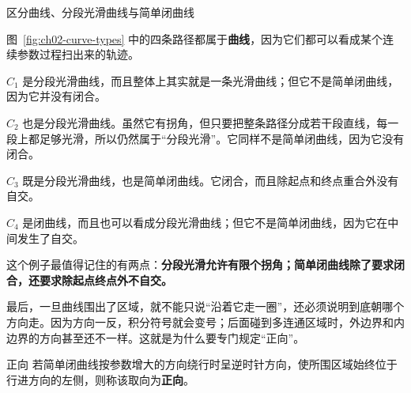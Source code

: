 \begin{lizi}{区分曲线、分段光滑曲线与简单闭曲线}{}
\begin{center}
\captionsetup{hypcap=false}
\label{fig:ch02-curve-types}
\captionsetup{hypcap=true}
\end{center}

\begin{jie}
图~\ref{fig:ch02-curve-types} 中的四条路径都属于\textbf{曲线}，因为它们都可以看成某个连续参数过程扫出来的轨迹。

$C_1$ 是分段光滑曲线，而且整体上其实就是一条光滑曲线；但它不是简单闭曲线，因为它并没有闭合。

$C_2$ 也是分段光滑曲线。虽然它有拐角，但只要把整条路径分成若干段直线，每一段上都足够光滑，所以仍然属于``分段光滑''。它同样不是简单闭曲线，因为它没有闭合。

$C_3$ 既是分段光滑曲线，也是简单闭曲线。它闭合，而且除起点和终点重合外没有自交。

$C_4$ 是闭曲线，而且也可以看成分段光滑曲线；但它不是简单闭曲线，因为它在中间发生了自交。

这个例子最值得记住的有两点：\textbf{分段光滑允许有限个拐角；简单闭曲线除了要求闭合，还要求除起点终点外不自交。}
\end{jie}
\end{lizi}

\noindent 最后，一旦曲线围出了区域，就不能只说``沿着它走一圈''，还必须说明到底朝哪个方向走。因为方向一反，积分符号就会变号；后面碰到多连通区域时，外边界和内边界的方向甚至还不一样。这就是为什么要专门规定``正向''。

\begin{dingliyi}{正向}{}
若简单闭曲线按参数增大的方向绕行时呈逆时针方向，使所围区域始终位于行进方向的左侧，则称该取向为\textbf{正向}。
\end{dingliyi}

